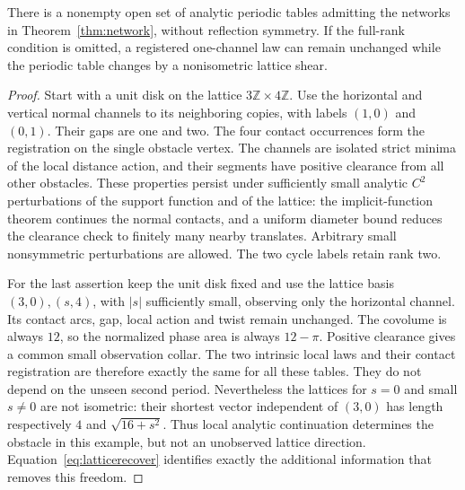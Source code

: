 \begin{proposition}
\label{prop:networkexamples}
There is a nonempty open set of analytic periodic tables admitting the
networks in Theorem~\ref{thm:network}, without reflection symmetry.
If the full-rank condition is omitted, a registered one-channel law can
remain unchanged while the periodic table changes by a nonisometric
lattice shear.
\end{proposition}
\begin{proof}
Start with a unit disk on the lattice $3\mathbb Z\times4\mathbb Z$.
Use the horizontal and vertical normal channels to its neighboring
copies, with labels $(1,0)$ and $(0,1)$. Their gaps are one and two.
The four contact occurrences form the registration on the single
obstacle vertex. The channels are isolated strict minima of the local
distance action, and their segments have positive clearance from all
other obstacles. These properties persist under sufficiently small
analytic $C^2$ perturbations of the support function and of the lattice:
the implicit-function theorem continues the normal contacts, and a
uniform diameter bound reduces the clearance check to finitely many
nearby translates. Arbitrary small nonsymmetric perturbations are
allowed. The two cycle labels retain rank two.

For the last assertion keep the unit disk fixed and use the lattice
basis $(3,0),(s,4)$, with $|s|$ sufficiently small, observing only the
horizontal channel. Its contact arcs, gap, local action and twist remain
unchanged. The covolume is always $12$, so the normalized phase area is
always $12-\pi$. Positive clearance gives a common small observation
collar. The two intrinsic local laws and their contact registration
are therefore exactly the same for all these tables. They do not depend
on the unseen second period. Nevertheless the lattices for $s=0$ and
small $s\ne0$ are not isometric: their shortest vector independent of
$(3,0)$ has length respectively $4$ and $\sqrt{16+s^2}$.
Thus local analytic continuation determines the obstacle in this example,
but not an unobserved lattice direction. Equation~\eqref{eq:latticerecover}
identifies exactly the additional information that removes this freedom.
\end{proof}
